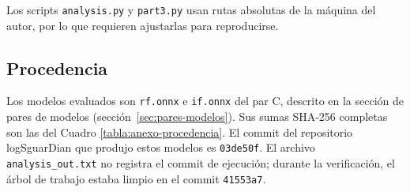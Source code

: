 Los scripts \texttt{analysis.py} y \texttt{part3.py} usan rutas absolutas de la máquina del autor, por lo que requieren ajustarlas para reproducirse.

\subsection{Procedencia}

Los modelos evaluados son \texttt{rf.onnx} e \texttt{if.onnx} del par C, descrito en la sección de pares de modelos (sección~\ref{sec:pares-modelos}). Sus sumas SHA-256 completas son las del Cuadro \ref{tabla:anexo-procedencia}. El commit del repositorio logSguarDian que produjo estos modelos es \texttt{03de50f}. El archivo \texttt{analysis\_out.txt} no registra el commit de ejecución; durante la verificación, el árbol de trabajo estaba limpio en el commit \texttt{41553a7}.

